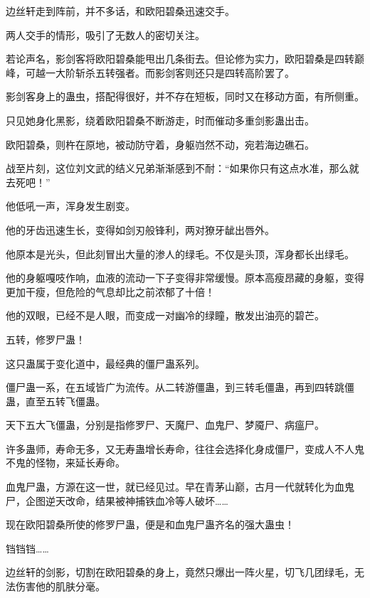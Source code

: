 
\begin{this_body}



边丝轩走到阵前，并不多话，和欧阳碧桑迅速交手。

两人交手的情形，吸引了无数人的密切关注。

若论声名，影剑客将欧阳碧桑能甩出几条街去。但论修为实力，欧阳碧桑是四转巅峰，可越一大阶斩杀五转强者。而影剑客则还只是四转高阶罢了。

影剑客身上的蛊虫，搭配得很好，并不存在短板，同时又在移动方面，有所侧重。

只见她身化黑影，绕着欧阳碧桑不断游走，时而催动多重剑影蛊出击。

欧阳碧桑，则杵在原地，被动防守着，身躯岿然不动，宛若海边礁石。

战至片刻，这位刘文武的结义兄弟渐渐感到不耐：“如果你只有这点水准，那么就去死吧！”

他低吼一声，浑身发生剧变。

他的牙齿迅速生长，变得如剑刃般锋利，两对獠牙龇出唇外。

他原本是光头，但此刻冒出大量的渗人的绿毛。不仅是头顶，浑身都长出绿毛。

他的身躯嘎吱作响，血液的流动一下子变得非常缓慢。原本高瘦昂藏的身躯，变得更加干瘦，但危险的气息却比之前浓郁了十倍！

他的双眼，已经不是人眼，而变成一对幽冷的绿瞳，散发出油亮的碧芒。

五转，修罗尸蛊！

这只蛊属于变化道中，最经典的僵尸蛊系列。

僵尸蛊一系，在五域皆广为流传。从二转游僵蛊，到三转毛僵蛊，再到四转跳僵蛊，直至五转飞僵蛊。

天下五大飞僵蛊，分别是指修罗尸、天魔尸、血鬼尸、梦魇尸、病瘟尸。

许多蛊师，寿命无多，又无寿蛊增长寿命，往往会选择化身成僵尸，变成人不人鬼不鬼的怪物，来延长寿命。

血鬼尸蛊，方源在这一世，就已经见过。早在青茅山巅，古月一代就转化为血鬼尸，企图逆天改命，结果被神捕铁血冷等人破坏……

现在欧阳碧桑所使的修罗尸蛊，便是和血鬼尸蛊齐名的强大蛊虫！

铛铛铛……

边丝轩的剑影，切割在欧阳碧桑的身上，竟然只爆出一阵火星，切飞几团绿毛，无法伤害他的肌肤分毫。


\end{this_body}
